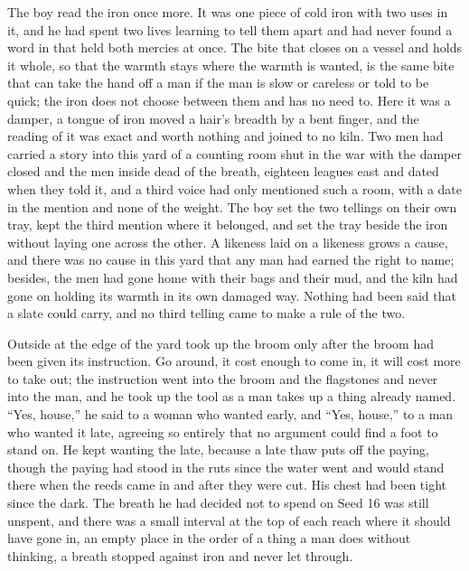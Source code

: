 The boy read the iron once more. It was one piece of cold iron with two uses in it, and he had spent two lives learning to tell them apart and had never found a word in  that held both mercies at once. The bite that closes on a vessel and holds it whole, so that the warmth stays where the warmth is wanted, is the same bite that can take the hand off a man if the man is slow or careless or told to be quick; the iron does not choose between them and has no need to. Here it was a damper, a tongue of iron moved a hair's breadth by a bent finger, and the reading of it was exact and worth nothing and joined to no kiln. Two men had carried a story into this yard of a counting room shut in the war with the damper closed and the men inside dead of the breath, eighteen leagues east and dated when they told it, and a third voice had only mentioned such a room, with a date in the mention and none of the weight. The boy set the two tellings on their own tray, kept the third mention where it belonged, and set the tray beside the iron without laying one across the other. A likeness laid on a likeness grows a cause, and there was no cause in this yard that any man had earned the right to name; besides, the men had gone home with their bags and their mud, and the kiln had gone on holding its warmth in its own damaged way. Nothing had been said that a slate could carry, and no third telling came to make a rule of the two.

\scenebreak

Outside at the edge of the yard  took up the broom only after the broom had been given its instruction. Go around, it cost enough to come in, it will cost more to take out; the instruction went into the broom and the flagstones and never into the man, and he took up the tool as a man takes up a thing already named. “Yes, house,” he said to a woman who wanted  early, and “Yes, house,” to a man who wanted it late, agreeing so entirely that no argument could find a foot to stand on. He kept wanting the late, because a late thaw puts off the paying, though the paying had stood in the ruts since the water went and would stand there when the reeds came in and after they were cut. His chest had been tight since the dark. The breath he had decided not to spend on Seed 16 was still unspent, and there was a small interval at the top of each reach where it should have gone in, an empty place in the order of a thing a man does without thinking, a breath stopped against iron and never let through.

